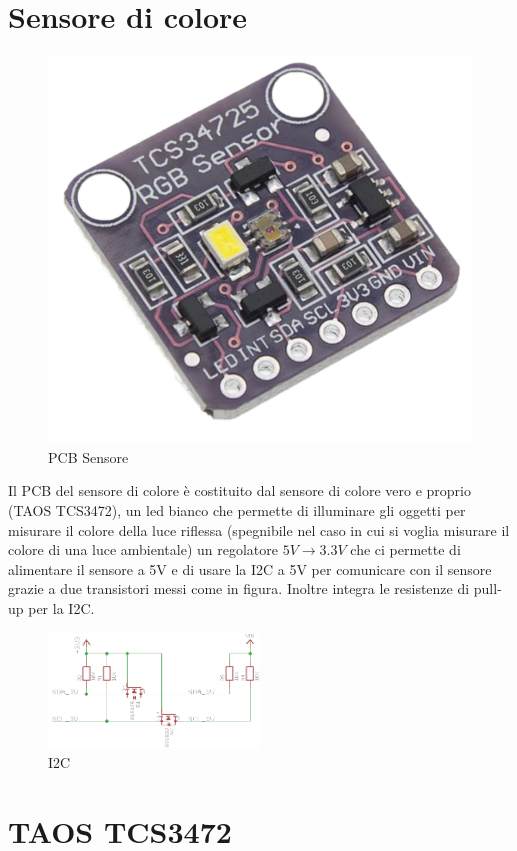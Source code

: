 \documentclass[12pt]{report}
\begin{document}
\section {Sensore di colore}
\begin{figure}
    \includegraphics[width=0.8\linewidth]{images/Immagini sensore/pcb sensore.png}
    \caption{PCB Sensore}
\end{figure}
Il PCB del sensore di colore è costituito dal sensore di colore vero e proprio (TAOS TCS3472), un led bianco che permette di illuminare gli oggetti per misurare il colore della luce riflessa 
(spegnibile nel caso in cui si voglia misurare il colore di una luce ambientale) un regolatore $5V \rightarrow 3.3V$ che ci permette di alimentare 
il sensore a 5V e di usare la I2C a 5V per comunicare con il sensore grazie a due transistori messi come in figura. Inoltre integra le resistenze di pull-up per la I2C.
\begin{figure}
    \centering
    \includegraphics[width=0.5\textwidth]{images/Immagini sensore/I2C_3.3 to 5.png}
    \caption{I2C}
\end{figure}

\section{TAOS TCS3472}
\end{document}
